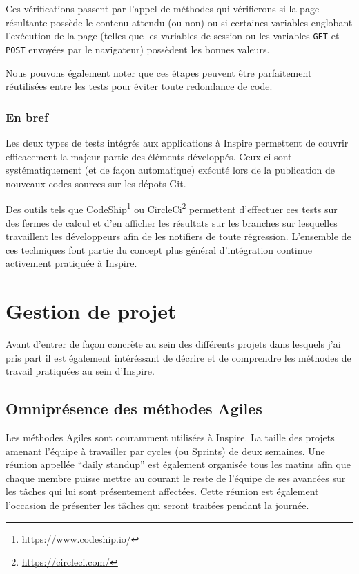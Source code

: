 \documentclass[12pt,a4paper]{book}
\begin{document}
Ces vérifications passent par l'appel de méthodes qui vérifierons si la page résultante possède le contenu attendu (ou non) ou si certaines variables englobant l'exécution de la page (telles que les variables de session ou les variables \texttt{GET} et \texttt{POST} envoyées par le navigateur) possèdent les bonnes valeurs.

Nous pouvons également noter que ces étapes peuvent être parfaitement réutilisées entre les tests pour éviter toute redondance de code.

\subsubsection{En bref}

Les deux types de tests intégrés aux applications à Inspire permettent de couvrir efficacement la majeur partie des éléments développés. Ceux-ci sont systématiquement (et de façon automatique) exécuté lors de la publication de nouveaux codes sources sur les dépots Git.

Des outils tels que CodeShip\footnote{\url{https://www.codeship.io/}} ou CircleCi\footnote{\url{https://circleci.com/}} permettent d'effectuer ces tests sur des fermes de calcul et d'en afficher les résultats sur les branches sur lesquelles travaillent les développeurs afin de les notifiers de toute régression. L'ensemble de ces techniques font partie du concept plus général d'intégration continue activement pratiquée à Inspire.

\section{Gestion de projet}

Avant d'entrer de façon concrète au sein des différents projets dans lesquels j'ai pris part il est également intéréssant de décrire et de comprendre les méthodes de travail pratiquées au sein d'Inspire.

\subsection{Omniprésence des méthodes Agiles}

Les méthodes Agiles sont couramment utilisées à Inspire. La taille des projets amenant l'équipe à travailler par cycles (ou Sprints) de deux semaines. Une réunion appellée ``daily standup'' est également organisée tous les matins afin que chaque membre puisse mettre au courant le reste de l'équipe de ses avancées sur les tâches qui lui sont présentement affectées. Cette réunion est également l'occasion de présenter les tâches qui seront traitées pendant la journée.
\end{document}
